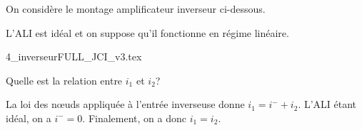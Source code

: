 


\hauteurLargeurCadreReponse		{8mm}{4cm}
\initialisationEntrainement

\debutEntrainement


On considère le montage amplificateur inverseur ci-dessous.

L’ALI est idéal et on suppose qu’il fonctionne en régime linéaire.


\shorthandoff{!:}
\begin{center}
  {4_inverseurFULL_JCI_v3.tex}
\end{center}
\shorthandon{!:}

\bigskip



\begin{enonce}
  Quelle est la relation entre \(i_{1}\) et \(i_{2}\)?
\end{enonce}


\begin{corrige}
  La loi des nœuds appliquée à l’entrée inverseuse donne \(i_{1} = i^{-}+ i_{2}\). L’ALI étant idéal, on a \(i^{-}=0\). Finalement, on a  donc \(i_{1}=i_{2} \).
\end{corrige}

